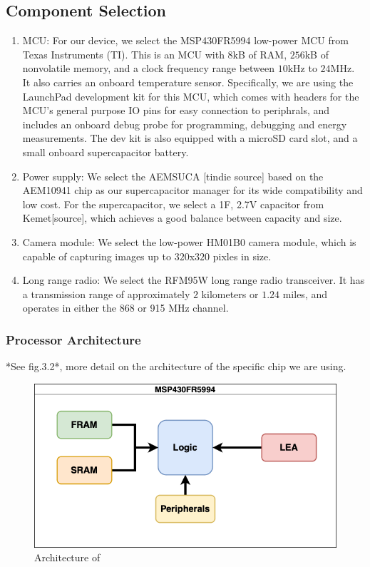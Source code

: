 \documentclass[twoside]{report}
\begin{document}
\subsection{Component Selection}
\begin{enumerate}
    \item MCU: For our device, we select the MSP430FR5994 low-power MCU from Texas Instruments (TI). 
    This is an MCU with $8$kB of RAM, $256$kB of nonvolatile memory, and a clock frequency range between 
    $10$kHz to $24$MHz. It also carries an onboard temperature sensor. 
    Specifically, we are using the LaunchPad development kit for this MCU, which comes with headers for 
    the MCU's general purpose IO pins for easy connection to periphrals, and
    includes an onboard debug probe for programming, debugging and energy measurements. 
    The dev kit is also equipped with a microSD card slot, and a small onboard supercapacitor battery.
    \item Power supply: We select the AEMSUCA [tindie source] based on the AEM10941 chip as our 
    supercapacitor manager for its wide compatibility and low cost. For the supercapacitor, we select 
    a 1F, 2.7V capacitor from Kemet[source], which achieves a good balance between capacity and size.
    \item Camera module: We select the low-power HM01B0 camera module, which is capable of capturing images up to 
          $320$x$320$ pixles in size.
    \item Long range radio: We select the RFM95W long range radio transceiver. It has a transmission range of 
          approximately $2$ kilometers or $1.24$ miles, and operates in either the 868 or 915 MHz channel.
\end{enumerate}
\subsubsection{Processor Architecture}
*See fig.3.2*, more detail on the architecture of the specific chip we are using.
\begin{figure}[ht]
    \centering
    \includegraphics[width=0.8\linewidth]{method/arch.png}
    \caption{Architecture of}
    \label{fig:arch}
\end{figure}
\end{document}
